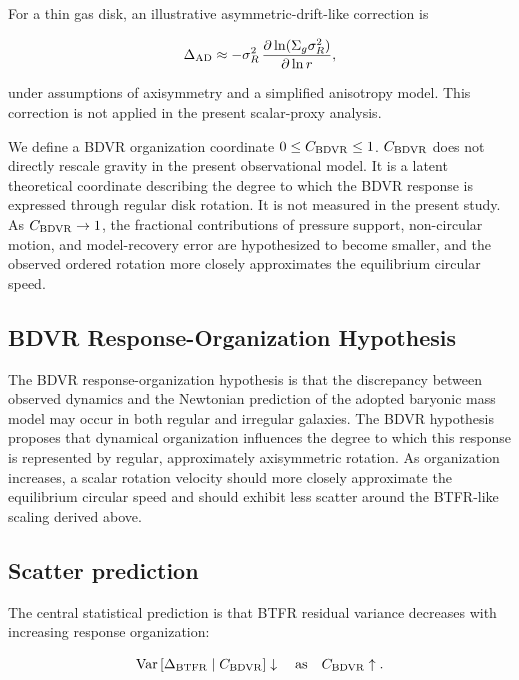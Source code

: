 \documentclass[11pt]{article}
\begin{document}
For a thin gas disk, an illustrative asymmetric-drift-like correction is

\begin{equation}
\Delta_{\rm AD} \approx -\sigma_R^2 \, \frac{\partial\ln(\Sigma_g \sigma_R^2)}{\partial\ln r},
\end{equation}

under assumptions of axisymmetry and a simplified anisotropy model. This correction is not applied in the present scalar-proxy analysis.

We define a BDVR organization coordinate $0 \leq C_{\rm BDVR} \leq 1$. $C_{\rm BDVR}$ does not directly rescale gravity in the present observational model. It is a latent theoretical coordinate describing the degree to which the BDVR response is expressed through regular disk rotation. It is not measured in the present study. As $C_{\rm BDVR} \rightarrow 1$, the fractional contributions of pressure support, non-circular motion, and model-recovery error are hypothesized to become smaller, and the observed ordered rotation more closely approximates the equilibrium circular speed.

\subsection{BDVR Response-Organization Hypothesis}

The BDVR response-organization hypothesis is that the discrepancy between observed dynamics and the Newtonian prediction of the adopted baryonic mass model may occur in both regular and irregular galaxies. The BDVR hypothesis proposes that dynamical organization influences the degree to which this response is represented by regular, approximately axisymmetric rotation. As organization increases, a scalar rotation velocity should more closely approximate the equilibrium circular speed and should exhibit less scatter around the BTFR-like scaling derived above.

\subsection{Scatter prediction}

The central statistical prediction is that BTFR residual variance decreases with increasing response organization:

\begin{equation}
\operatorname{Var}\left[ \Delta_{\rm BTFR} \mid C_{\rm BDVR} \right] \downarrow \quad \text{as} \quad C_{\rm BDVR} \uparrow.
\label{eq:pred_var}
\end{equation}
\end{document}
